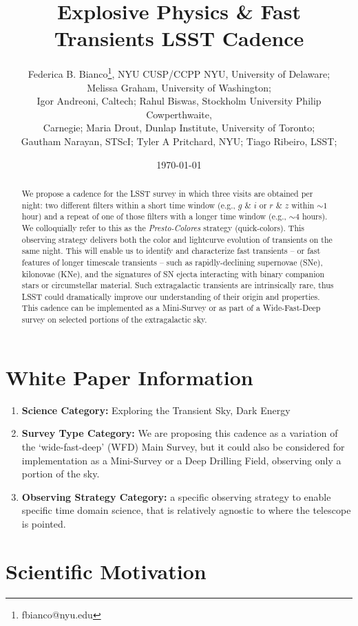 \documentclass[12pt, letterpaper]{article}
\title{Explosive Physics \& Fast Transients LSST Cadence}
\author{\small{Federica B. Bianco\footnote{fbianco@nyu.edu}, NYU CUSP/CCPP NYU, University of Delaware;}\\\small{Melissa Graham, University of Washington;}\\\small{Igor Andreoni, Caltech; Rahul Biswas, Stockholm University Philip Cowperthwaite,}\\\small{Carnegie; Maria Drout, Dunlap Institute, University of Toronto;}\\\small{Gautham Narayan, STScI; Tyler A Pritchard, NYU; Tiago Ribeiro, LSST; 
}}
\date{\today}
\begin{document}
\maketitle

\begin{abstract}
We propose a cadence for the LSST survey in which three visits are obtained per night: two different filters within a short time window (e.g., $g$ \& $i$ or $r$ \& $z$ within $\sim1$ hour) and a repeat of one of those filters with a longer time window (e.g., $\sim4$ hours). We colloquially refer to this as the {\em Presto-Colores} strategy (quick-colors). This observing strategy delivers both the color and lightcurve evolution of transients on the same night. This will enable us to identify and characterize fast transients -- or fast features of longer timescale transients -- such as rapidly-declining supernovae (SNe), kilonovae (KNe), and the signatures of SN ejecta interacting with binary companion stars or circumstellar material. Such extragalactic transients are intrinsically rare, thus LSST could dramatically improve our understanding of their origin and properties. This cadence can be implemented as a Mini-Survey or as part of a Wide-Fast-Deep survey on selected portions of the extragalactic sky.
\end{abstract}

\section{White Paper Information}
\begin{enumerate} 
\item {\bf Science Category:} Exploring the Transient Sky, Dark Energy
\item {\bf Survey Type Category:} 
We are proposing this cadence as a variation of the  `wide-fast-deep' (WFD) Main Survey, but it could also be considered for implementation as a Mini-Survey or a Deep Drilling Field, observing only a portion of the sky. 
\item {\bf Observing Strategy Category:} 
   a specific observing strategy to enable specific time domain science, that is relatively agnostic to where the telescope is pointed. 
\end{enumerate}  


\clearpage
\section{Scientific Motivation}
\end{document}
